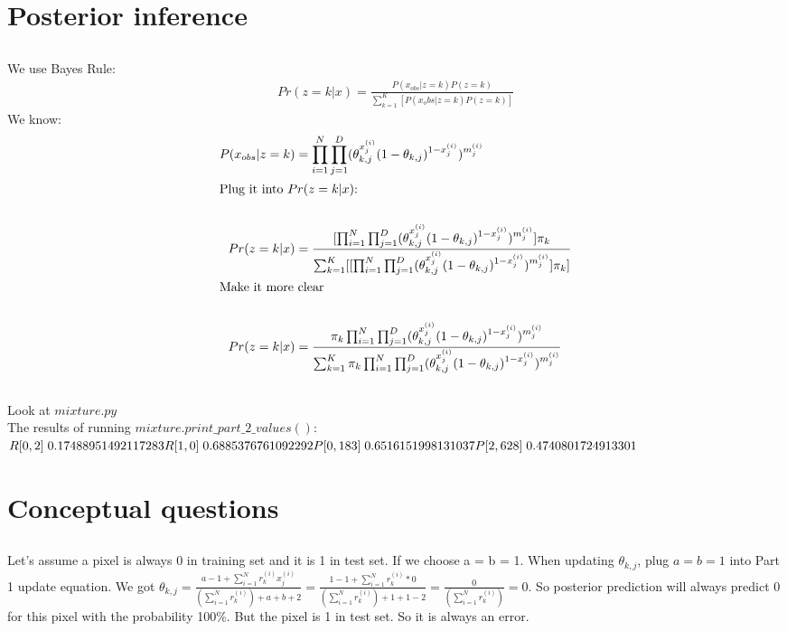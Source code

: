 \documentclass{article}
\begin{document}
\section{Posterior inference}
\subsection{}
We use Bayes Rule:
\begin{align*}
    Pr(z=k|x)=\frac{P(x_{obs}|z=k)P(z=k)}{\sum_{k=1}^{K}[P(x_obs|z=k)P(z=k)]}
\end{align*}
We know:
\begin{align*}
    P(x_{obs}|z=k)&=\prod_{i=1}^{N}\prod_{j=1}^{D}(\theta_{k,j}^{x_j^{(i)}}(1-\theta_{k,j})^{1-x_j^{(i)}})^{m_j^{(i)}}\\
\intertext{Plug it into $Pr(z=k|x)$:}\\
    Pr(z=k|x)&=\frac{[\prod_{i=1}^{N}\prod_{j=1}^{D}(\theta_{k,j}^{x_j^{(i)}}(1-\theta_{k,j})^{1-x_j^{(i)}})^{m_j^{(i)}}]\pi_k}{\sum_{k=1}^{K}[[\prod_{i=1}^{N}\prod_{j=1}^{D}(\theta_{k,j}^{x_j^{(i)}}(1-\theta_{k,j})^{1-x_j^{(i)}})^{m_j^{(i)}}]\pi_k]}\\
\intertext{Make it more clear}\\
    Pr(z=k|x)&=\frac{\pi_k\prod_{i=1}^{N}\prod_{j=1}^{D}(\theta_{k,j}^{x_j^{(i)}}(1-\theta_{k,j})^{1-x_j^{(i)}})^{m_j^{(i)}}}{\sum_{k=1}^{K}\pi_k\prod_{i=1}^{N}\prod_{j=1}^{D}(\theta_{k,j}^{x_j^{(i)}}(1-\theta_{k,j})^{1-x_j^{(i)}})^{m_j^{(i)}}}\\
\end{align*}

\subsection{}
Look at $mixture.py$\\
The results of running $mixture.print\_part\_2\_values()$:\\
$R[0, 2] \; 0.17488951492117283\\
R[1, 0] \; 0.6885376761092292\\
P[0, 183] \; 0.6516151998131037\\
P[2, 628] \; 0.4740801724913301\\$
\section{Conceptual questions}
\subsection{}
Let's assume a pixel is always 0 in training set and it is 1 in test set. If we choose a = b = 1. When updating $\theta_{k,j}$, plug $a=b=1$ into Part 1 update equation. We got $\theta_{k,j} = \frac{a-1+\sum_{i = 1}^{N}r_k^{(i)}x_j^{(i)} }{(\sum_{i = 1}^{N}r_k^{(i)})+a+b+2}=\frac{1-1+\sum_{i = 1}^{N}r_k^{(i)}*0}{(\sum_{i = 1}^{N}r_k^{(i)})+1+1-2}=\frac{0}{(\sum_{i = 1}^{N}r_k^{(i)})}=0$. So posterior prediction will always predict 0 for this pixel with the probability 100\%. But the pixel is 1 in test set. So it is always an error.
\end{document}
